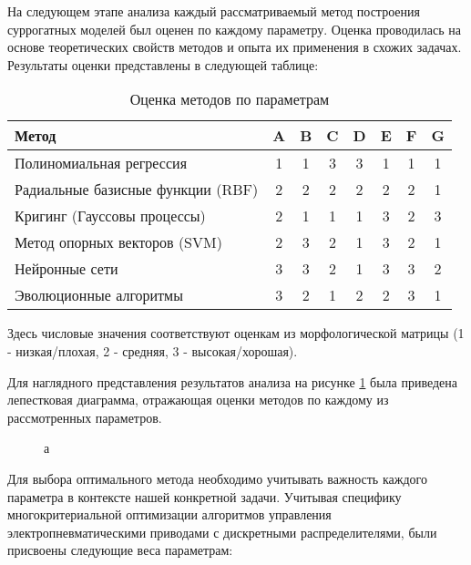 На следующем этапе анализа каждый рассматриваемый метод
построения суррогатных моделей был оценен по каждому параметру.
Оценка проводилась на основе теоретических свойств методов и опыта
их применения в схожих задачах. Результаты оценки представлены в следующей таблице:

\begin{table}[h]
    \centering
    \caption{Оценка методов по параметрам}
    \begin{tabular}{|l|c|c|c|c|c|c|c|}
        \hline
        Метод                             & A & B & C & D & E & F & G \\
        \hline
        Полиномиальная регрессия          & 1 & 1 & 3 & 3 & 1 & 1 & 1 \\
        \hline
        Радиальные базисные функции (RBF) & 2 & 2 & 2 & 2 & 2 & 2 & 1 \\
        \hline
        Кригинг (Гауссовы процессы)       & 2 & 1 & 1 & 1 & 3 & 2 & 3 \\
        \hline
        Метод опорных векторов (SVM)      & 2 & 3 & 2 & 1 & 3 & 2 & 1 \\
        \hline
        Нейронные сети                    & 3 & 3 & 2 & 1 & 3 & 3 & 2 \\
        \hline
        Эволюционные алгоритмы            & 3 & 2 & 1 & 2 & 2 & 3 & 1 \\
        \hline
    \end{tabular}
    \label{tab:method_evaluation}
\end{table}

Здесь числовые значения соответствуют оценкам из
морфологической матрицы (1 - низкая/плохая, 2 - средняя, 3 - высокая/хорошая).

Для наглядного представления результатов анализа на рисунке \ref{fig:morphological_analysis}
была приведена лепестковая диаграмма, отражающая оценки методов по каждому из
рассмотренных параметров.

\begin{figure}[ht]
    \caption{а}\label{fig:morphological_analysis}
\end{figure}

Для выбора оптимального метода необходимо учитывать важность
каждого параметра в контексте нашей конкретной задачи.
Учитывая специфику многокритериальной оптимизации алгоритмов
управления электропневматическими приводами с дискретными
распределителями, были присвоены следующие веса параметрам:

